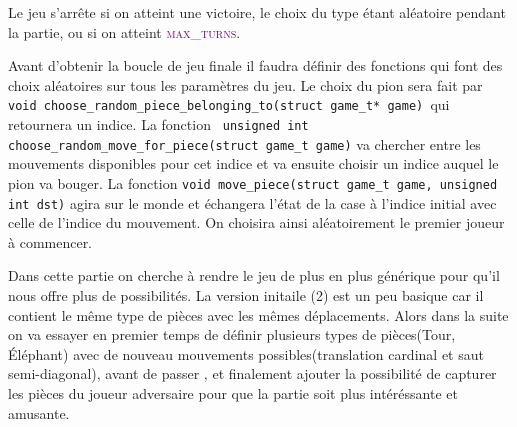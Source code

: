 \documentclass[a4paper]{article}
\begin{document}
Le jeu s’arrête si on atteint une victoire, le choix du type étant aléatoire pendant la partie, ou si on atteint \textcolor{purple}{\textsc{max\_turns}}. 

Avant d’obtenir la boucle de jeu finale il faudra définir des fonctions qui font des choix aléatoires sur tous les paramètres du jeu. 
Le choix du pion sera fait par \lstinline|void choose_random_piece_belonging_to(struct game_t* game) |qui retournera un indice. La fonction \lstinline| unsigned int choose_random_move_for_piece(struct game_t game)| va chercher entre les mouvements disponibles pour cet indice et va ensuite choisir un indice auquel le pion va bouger. La fonction \lstinline|void move_piece(struct game_t game, unsigned int dst)| agira sur le monde et échangera l’état de la case à l’indice initial avec celle de l’indice du mouvement. On choisira ainsi aléatoirement le premier joueur à commencer. 

Dans cette partie on cherche à rendre le jeu de plus en plus générique pour qu'il nous offre plus de possibilités. La version initaile (2) est un peu basique car il contient le même type de pièces avec les mêmes déplacements.
Alors dans la suite on va essayer en premier temps de définir plusieurs types de pièces(Tour, Éléphant) avec de nouveau mouvements possibles(translation cardinal et saut semi-diagonal), avant de passer , et finalement ajouter la possibilité de capturer les pièces du joueur adversaire pour que la partie soit plus intéréssante et amusante.
\end{document}

